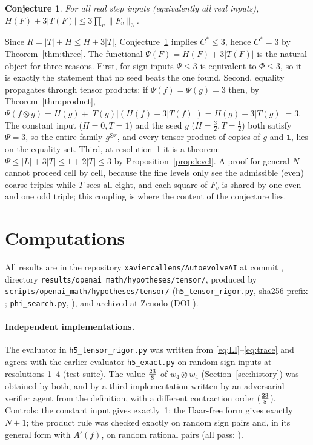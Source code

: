 \documentclass[11pt]{article}
\newtheorem{conjecture}[theorem]{Conjecture}
\theoremstyle{remark}
\begin{document}
\begin{conjecture}\label{conj:psi}
For all real step inputs (equivalently all real inputs), $H(F)+3|T(F)|\le3\prod_v\|F_v\|_3$.
\end{conjecture}

Since $R=|T|+H\le H+3|T|$, Conjecture~\ref{conj:psi} implies $C^\ast\le3$, hence $C^\ast=3$ by
Theorem~\ref{thm:three}. The functional $\Psi(F)=H(F)+3|T(F)|$ is the natural object for three reasons. First, for sign
inputs $\Psi\le3$ is equivalent to $\Phi\le3$, so it is exactly the statement that no seed beats the one found. Second,
equality propagates through tensor products: if $\Psi(f)=\Psi(g)=3$ then, by Theorem~\ref{thm:product},
$\Psi(f\otimes g)=H(g)+|T(g)|(H(f)+3|T(f)|)=H(g)+3|T(g)|=3$. The constant input ($H=0,T=1$) and the seed $g$
($H=\tfrac32,T=\tfrac12$) both satisfy $\Psi=3$, so the entire family $g^{\otimes r}$, and every tensor product of
copies of $g$ and $\mathbf 1$, lies on the equality set. Third, at resolution~1 it is a theorem:
$\Psi\le|L|+3|T|\le1+2|T|\le3$ by Proposition~\ref{prop:level}. A proof for general $N$ cannot proceed cell by cell,
because the fine levels only see the admissible (even) coarse triples while $T$ sees all eight, and each square of
$F_v$ is shared by one even and one odd triple; this coupling is where the content of the conjecture lies.

\section{Computations}\label{sec:comp}

All results are in the repository \texttt{xaviercallens/AutoevolveAI} at commit \texttt{\gitcommit}, directory
\texttt{results/openai\_math/hypotheses/tensor/}, produced by \texttt{scripts/openai\_math/hypotheses/tensor/}
(\texttt{h5\_tensor\_rigor.py}, sha256 prefix \texttt{\rigorSha}; \texttt{phi\_search.py}, \texttt{\searchSha}), and
archived at Zenodo (DOI \zenodoDOI).

\paragraph{Independent implementations.} The evaluator in \texttt{h5\_tensor\_rigor.py} was written from
\eqref{eq:LI}--\eqref{eq:trace} and agrees with the earlier evaluator \texttt{h5\_exact.py} on random sign inputs at
resolutions 1--4 (test suite). The value $\tfrac{23}{8}$ of $w_4\otimes w_4$ (Section~\ref{sec:history}) was obtained
by both, and by a third implementation written by an adversarial verifier agent from the definition, with a different
contraction order ($\tfrac{23}{8}$). Controls: the constant input gives exactly~1; the Haar-free form gives exactly
$N+1$; the product rule was checked exactly on \prodRulePairs{} random sign pairs and, in its general form with $A'(f)$,
on \prodRuleGeneralPairs{} random rational pairs (all pass: \prodRuleAllPass).
\end{document}
